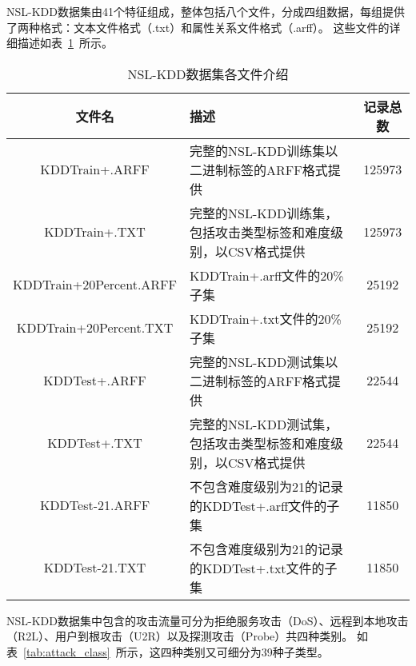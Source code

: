 NSL-KDD数据集由41个特征组成，整体包括八个文件，分成四组数据，每组提供了两种格式：文本文件格式（.txt）和属性关系文件格式（.arff）。
这些文件的详细描述如表~\ref{tab:NSLKDDFile}~所示。
\begin{table}[htbp]
	\caption{NSL-KDD数据集各文件介绍}
	\label{tab:NSLKDDFile}
	\begin{tabularx}{\textwidth}{cXc}
		\toprule
		\textbf{文件名}         & \textbf{描述}                                                  & \textbf{记录总数} \\
		\midrule
		KDDTrain+.ARFF          & 完整的NSL-KDD训练集以二进制标签的ARFF格式提供                  & 125973            \\
		KDDTrain+.TXT           & 完整的NSL-KDD训练集，包括攻击类型标签和难度级别，以CSV格式提供 & 125973            \\
		KDDTrain+20Percent.ARFF & KDDTrain+.arff文件的20\%子集                                   & 25192             \\
		KDDTrain+20Percent.TXT  & KDDTrain+.txt文件的20\%子集                                    & 25192             \\
		KDDTest+.ARFF           & 完整的NSL-KDD测试集以二进制标签的ARFF格式提供                  & 22544             \\
		KDDTest+.TXT            & 完整的NSL-KDD测试集，包括攻击类型标签和难度级别，以CSV格式提供 & 22544             \\
		KDDTest-21.ARFF         & 不包含难度级别为21的记录的KDDTest+.arff文件的子集              & 11850             \\
		KDDTest-21.TXT          & 不包含难度级别为21的记录的KDDTest+.txt文件的子集               & 11850             \\
		\bottomrule
	\end{tabularx}
\end{table}
NSL-KDD数据集中包含的攻击流量可分为拒绝服务攻击（DoS）、远程到本地攻击（R2L）、用户到根攻击（U2R）以及探测攻击（Probe）共四种类别。
如表~\ref{tab:attack_class}~所示，这四种类别又可细分为39种子类型。
